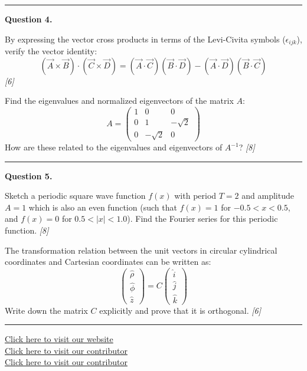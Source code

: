 \documentclass[11pt,a4paper]{article}
\newcommand{\pts}[1]{\hfill   \textit{[#1]}}
\begin{document}
\medskip\rule{\linewidth}{0.2pt}




\noindent   \textbf{Question 4.}

\begin{parts}
  \item By expressing the vector cross products in terms of the Levi-Civita symbols ($\epsilon_{ijk}$), verify the vector identity:
    \[ (\vec{A}  \times \vec{B}) \cdot (\vec{C}  \times \vec{D}) = (\vec{A} \cdot \vec{C})(\vec{B} \cdot \vec{D}) - (\vec{A} \cdot \vec{D})(\vec{B} \cdot \vec{C}) \] \pts{6}
  \item Find the eigenvalues and normalized eigenvectors of the matrix $A$:
    \[ A = 
\begin{pmatrix} 1 & 0 & 0 \\ 0 & 1 & -\sqrt{2} \\ 0 & -\sqrt{2} & 0 \end{pmatrix} \]
    How are these related to the eigenvalues and eigenvectors of $A^{-1}$? \pts{8}
\end{parts}

\medskip\rule{\linewidth}{0.2pt}




\noindent   \textbf{Question 5.}

\begin{parts}
  \item Sketch a periodic square wave function $f(x)$ with period $T=2$ and amplitude $A=1$ which is also an even function (such that $f(x) = 1$ for $-0.5 < x < 0.5$, and $f(x) = 0$ for $0.5 < |x| < 1.0$). Find the Fourier series for this periodic function. \pts{8}
  \item The transformation relation between the unit vectors in circular cylindrical coordinates and Cartesian coordinates can be written as:
    \[ 
\begin{pmatrix} \hat{\rho} \\ \hat{\phi} \\ \hat{z} \end{pmatrix} = C 
\begin{pmatrix} \hat{i} \\ \hat{j} \\ \hat{k} \end{pmatrix} \]
    Write down the matrix $C$ explicitly and prove that it is orthogonal. \pts{6}
\end{parts}

\vfill
\rule{\linewidth}{0.4pt}

\begin{center}\small
  \href{https://bhu-exam.vercel.app/}{Click here to visit our website}\\[4pt]
  \href{https://me-aryan.vercel.app/}{Click here to visit our contributor}\\[4pt]
  \href{https://quashan-me.vercel.app/}{Click here to visit our contributor}
\end{center}
\end{document}
